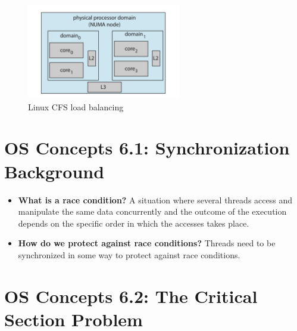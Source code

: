 \documentclass[12pt]{article}
\begin{document}
\begin{itemize}
    \begin{figure}[ht]
        \centering
        \includegraphics[width=0.6\textwidth]{figures/cfs-load-balancing.jpg}
        \caption{Linux CFS load balancing}
        \label{fig:cfs-load-balancing}
    \end{figure}
\end{itemize}

\section*{OS Concepts 6.1: Synchronization Background}

\begin{itemize}
    \item \textbf{What is a race condition?} A situation where several threads access and manipulate the same data concurrently and the outcome of the execution depends on the specific order in which the accesses takes place.
    \item \textbf{How do we protect against race conditions?} Threads need to be synchronized in some way to protect against race conditions.
\end{itemize}

\section*{OS Concepts 6.2: The Critical Section Problem}
\end{document}
